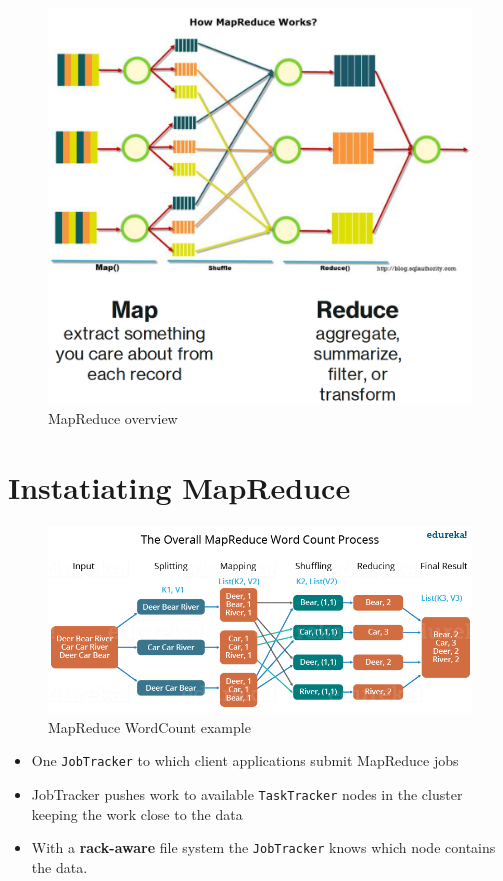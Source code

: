 \begin{figure}[htbp]
   \centering
   \includegraphics[width=0.4\columnwidth]{images/14/mapreduce_overview.png}
   \caption{MapReduce overview}
   \label{fig:14/mapreduce_overview}
\end{figure}


\newpage
\section{Instatiating MapReduce}
\begin{figure}[htbp]
   \centering
   \includegraphics{images/14/mapreduce_wordcount.png}
   \caption{MapReduce WordCount example}
   \label{fig:14/mapreduce_wordcount}
\end{figure}

\begin{itemize}
   \item One \texttt{JobTracker} to which client applications
   submit MapReduce jobs
   \item JobTracker pushes work to available \texttt{TaskTracker} nodes in the cluster keeping the work close to the data
   \item With a \textbf{rack-aware} file system the \texttt{JobTracker} knows which node contains the data.
\end{itemize}

